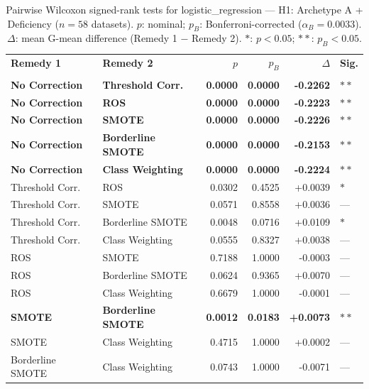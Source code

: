 \begin{table}[ht]
\centering
\scriptsize
\caption{Pairwise Wilcoxon signed-rank tests for logistic_regression --- H1: Archetype A + Deficiency ($n=58$ datasets). $p$: nominal; $p_B$: Bonferroni-corrected ($\alpha_B=0.0033$). $\Delta$: mean G-mean difference (Remedy 1 $-$ Remedy 2). $\ast$: $p<0.05$; $\ast\ast$: $p_B<0.05$.}
\label{tab:wilcoxon_logistic_regression_h1}
\begin{tabular}{llrrrl}
\toprule
\textbf{Remedy 1} & \textbf{Remedy 2} & \textbf{$p$} & \textbf{$p_B$} & \textbf{$\Delta$} &  \textbf{Sig.} \\\\
\midrule
    \textbf{No Correction} & \textbf{Threshold Corr.} & \textbf{0.0000} & \textbf{0.0000} & \textbf{-0.2262} & $\ast\ast$ \\
    \textbf{No Correction} & \textbf{ROS} & \textbf{0.0000} & \textbf{0.0000} & \textbf{-0.2223} & $\ast\ast$ \\
    \textbf{No Correction} & \textbf{SMOTE} & \textbf{0.0000} & \textbf{0.0000} & \textbf{-0.2226} & $\ast\ast$ \\
    \textbf{No Correction} & \textbf{Borderline SMOTE} & \textbf{0.0000} & \textbf{0.0000} & \textbf{-0.2153} & $\ast\ast$ \\
    \textbf{No Correction} & \textbf{Class Weighting} & \textbf{0.0000} & \textbf{0.0000} & \textbf{-0.2224} & $\ast\ast$ \\
    Threshold Corr. & ROS & 0.0302 & 0.4525 & +0.0039 & $\ast$ \\
    Threshold Corr. & SMOTE & 0.0571 & 0.8558 & +0.0036 & --- \\
    Threshold Corr. & Borderline SMOTE & 0.0048 & 0.0716 & +0.0109 & $\ast$ \\
    Threshold Corr. & Class Weighting & 0.0555 & 0.8327 & +0.0038 & --- \\
    ROS & SMOTE & 0.7188 & 1.0000 & -0.0003 & --- \\
    ROS & Borderline SMOTE & 0.0624 & 0.9365 & +0.0070 & --- \\
    ROS & Class Weighting & 0.6679 & 1.0000 & -0.0001 & --- \\
    \textbf{SMOTE} & \textbf{Borderline SMOTE} & \textbf{0.0012} & \textbf{0.0183} & \textbf{+0.0073} & $\ast\ast$ \\
    SMOTE & Class Weighting & 0.4715 & 1.0000 & +0.0002 & --- \\
    Borderline SMOTE & Class Weighting & 0.0743 & 1.0000 & -0.0071 & --- \\
\bottomrule
\end{tabular}
\end{table}